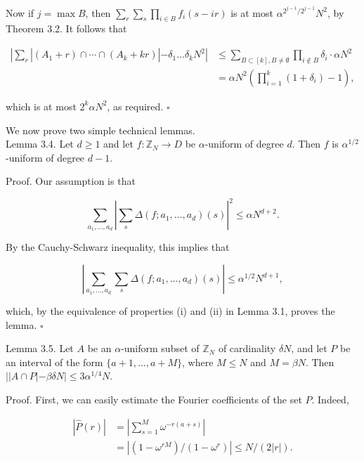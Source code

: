 \documentclass[10pt]{article}
\begin{document}
Now if $j=\max B$, then $\sum_{r} \sum_{s} \prod_{i \in B} f_{i}(s-i r)$ is at most $\alpha^{2^{j-1} / 2^{j-1}} N^{2}$, by Theorem 3.2. It follows that

$$
\begin{aligned}
\left|\sum_{r}\right|\left(A_{1}+r\right) \cap \cdots \cap\left(A_{k}+k r\right)\left|-\delta_{1} \ldots \delta_{k} N^{2}\right| & \leqslant \sum_{B \subset[k], B \neq \emptyset} \prod_{i \notin B} \delta_{i} \cdot \alpha N^{2} \\
& =\alpha N^{2}\left(\prod_{i=1}^{k}\left(1+\delta_{i}\right)-1\right),
\end{aligned}
$$

which is at most $2^{k} \alpha N^{2}$, as required. \(\square\)

We now prove two simple technical lemmas.\\
Lemma 3.4. Let $d \geqslant 1$ and let $f: \mathbb{Z}_{N} \rightarrow D$ be $\alpha$-uniform of degree $d$. Then $f$ is $\alpha^{1 / 2}$-uniform of degree $d-1$.

Proof. Our assumption is that

$$
\sum_{a_{1}, \ldots, a_{d}}\left|\sum_{s} \Delta\left(f ; a_{1}, \ldots, a_{d}\right)(s)\right|^{2} \leqslant \alpha N^{d+2} .
$$

By the Cauchy-Schwarz inequality, this implies that

$$
\left|\sum_{a_{1}, \ldots, a_{d}} \sum_{s} \Delta\left(f ; a_{1}, \ldots, a_{d}\right)(s)\right| \leqslant \alpha^{1 / 2} N^{d+1},
$$

which, by the equivalence of properties (i) and (ii) in Lemma 3.1, proves the lemma. \(\square\)

Lemma 3.5. Let $A$ be an $\alpha$-uniform subset of $\mathbb{Z}_{N}$ of cardinality $\delta N$, and let $P$ be an interval of the form $\{a+1, \ldots, a+M\}$, where $M\leq N$ and $M=\beta N$. Then $||A \cap P|-\beta \delta N| \leqslant 3\alpha^{1 / 4} N$.

Proof. First, we can easily estimate the Fourier coefficients of the set $P$. Indeed,

$$
\begin{aligned}
|\hat{P}(r)| & =\left|\sum_{s=1}^{M} \omega^{-r(a+s)}\right| \\
& =\left|\left(1-\omega^{r M}\right) /\left(1-\omega^{r}\right)\right| \leqslant N /(2|r|) .
\end{aligned}
$$
\end{document}
